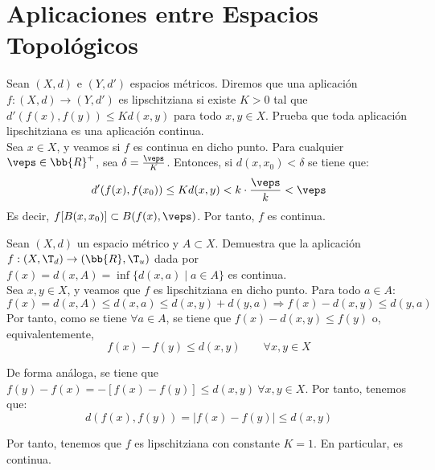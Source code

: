 \section{Aplicaciones entre Espacios Topológicos}\label{sec:Rel2}

\begin{ejercicio}
    Sean $(X, d)$ e $(Y, d')$ espacios métricos. Diremos que una aplicación $f : (X, d) \to (Y, d')$ es lipschitziana si existe $K > 0$ tal que $d'(f(x), f(y)) \leq Kd(x, y)$ para todo $x, y \in X$. Prueba que toda aplicación lipschitziana es una aplicación continua.\\

    Sea $x\in X$, y veamos si $f$ es continua en dicho punto. Para cualquier $\veps\in \bb{R}^+$, sea $\delta=\frac{\veps}{K}$. Entonces, si $d(x,x_0)<\delta$ se tiene que:
    \begin{equation*}
        d'(f(x), f(x_0)) \leq Kd(x,y) < k\cdot \frac{\veps}{k} < \veps
    \end{equation*}
    Es decir, $f[B(x,x_0)]\subset B(f(x), \veps)$. Por tanto, $f$ es continua.
\end{ejercicio}

\begin{ejercicio}
    Sean $(X, d)$ un espacio métrico y $A \subset X$. Demuestra que la aplicación $f : (X, \T_d) \to (\bb{R},\T_u)$ dada por $f(x) = d(x, A) = \inf\{d(x, a) \mid a \in A\}$ es continua.\\

    Sea $x,y\in X$, y veamos que $f$ es lipschitziana en dicho punto. Para todo $a\in A$:
    \begin{equation*}
        f(x) = d(x,A) \leq d(x,a) \leq d(x,y) + d(y,a) \Longrightarrow f(x) - d(x,y) \leq d(y,a)
    \end{equation*}
    Por tanto, como se tiene $\forall a\in A$, se tiene que $f(x)-d(x,y)\leq f(y)$ o, equivalentemente,
    \begin{equation*}
        f(x)-f(y) \leq d(x,y) \qquad \forall x,y\in X
    \end{equation*}
    
    De forma análoga, se tiene que $f(y)-f(x) = -[f(x)-f(y)] \leq d(x,y) ~ \forall x,y\in X$. Por tanto, tenemos que:
    \begin{equation*}
        d(f(x),f(y)) = |f(x)-f(y)| \leq d(x,y)
    \end{equation*}
    
    Por tanto, tenemos que $f$ es lipschitziana con constante $K=1$. En particular, es continua.
\end{ejercicio}

